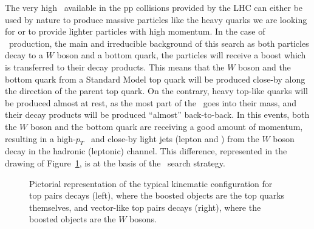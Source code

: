 The very high \cme\ available in the pp collisions provided by the LHC
can either be used by nature to produce massive particles like the heavy 
quarks we are looking for or to provide lighter particles with high momentum.
In the case of \ttbar\ production, the main and irreducible background
of this search as both particles decay to a $W$ boson and a bottom quark,
the particles will receive a boost which is transferred to their decay
products. This means that the $W$ boson and the bottom quark from a Standard
Model top quark will be produced close-by along the direction of the parent
top quark. On the contrary, heavy top-like quarks will be produced almost
at rest, as the most part of the \cme\ goes into their mass, and their
decay products will be produced ``almost'' back-to-back. In this events,
both the $W$ boson and the bottom quark are receiving a good amount of
momentum, resulting in a high-$p_T$ \bjet\ and close-by light jets (lepton and \met)
from the $W$ boson decay in the hadronic (leptonic) channel. This
difference, represented in the drawing of Figure~\ref{fig:boostedkin},
is at the basis of the \wbx\ search strategy.

\begin{figure}[htb]\begin{center}
	\caption{Pictorial representation of the typical kinematic configuration
        for top pairs decays (left), where the boosted objects are the top
        quarks themselves, and vector-like top pairs decays (right), where the
        boosted objects are the $W$ bosons.\label{fig:boostedkin}}
\end{center}\end{figure}

